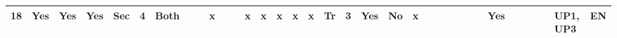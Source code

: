 {\begin{table}
{\begin{tabular}{|l|l|l|l|l|l|l|l|l|l|l|l|l|l|l|l|l|l|l|l|l|l|l|l|l|l|l|l|l|l|l|l|l|l|l|}
18                                        & Yes                                                          & Yes                                                         & Yes                                                          & Sec                                                       & 4                                                        & Both                                                          &                                      &                                     & x                                     &                                      &                                      & x                                 & x                                  & x                                  & x                                  & x                                     & Tr                                                       & 3                                                           & Yes                                                         & No                                                           & x                                              &                                        &                                    &                                       &                                  &                                         &                                      & Yes                                                        &                                                                &                                       &                                           &                                              & UP1, UP3                                 & EN                                          \\ \hline

\end{tabular}}
\end{table}}

